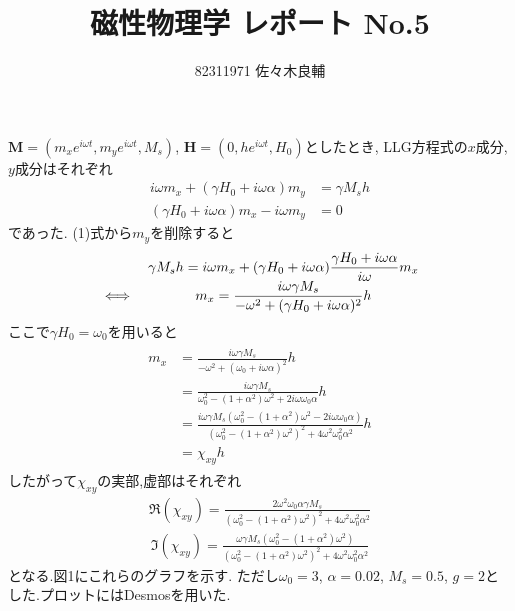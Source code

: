 \documentclass[uplatex,a4j,11pt,dvipdfmx]{jsarticle}
\begin{document}
\title{磁性物理学 レポート No.5}
\author{82311971 佐々木良輔}
\date{}
\maketitle
${\bm M}=(m_xe^{i\omega t},m_ye^{i\omega t},M_s)$, ${\bm H}=(0,he^{i\omega t}, H_0)$としたとき,
LLG方程式の$x$成分, $y$成分はそれぞれ
\begin{align}
  i\omega m_x+(\gamma H_0+i\omega\alpha)m_y&=\gamma M_s h\\
  (\gamma H_0+i\omega \alpha)m_x-i\omega m_y&=0
\end{align}
であった. (1)式から$m_y$を削除すると
\begin{align}
  {
    \everymath{\displaystyle}
    \begin{array}{cc}
      &\gamma M_sh=i\omega m_x+(\gamma H_0+i\omega\alpha)\frac{\gamma H_0+i\omega\alpha}{i\omega}m_x\\
      \iff&m_x=\frac{i\omega\gamma M_s}{-\omega^2+(\gamma H_0+i\omega\alpha)^2}h\\
    \end{array}
  }
\end{align}
ここで$\gamma H_0=\omega_0$を用いると
\begin{align}
  \begin{split}
    m_x&=\frac{i\omega\gamma M_s}{-\omega^2+(\omega_0+i\omega\alpha)^2}h\\
    &=\frac{i\omega\gamma M_s}{\omega_0^2-(1+\alpha^2)\omega^2+2i\omega\omega_0\alpha}h\\
    &=\frac{i\omega\gamma M_s\left(\omega_0^2-(1+\alpha^2)\omega^2-2i\omega\omega_0\alpha\right)}
    {\left(\omega_0^2-(1+\alpha^2)\omega^2\right)^2+4\omega^2\omega_0^2\alpha^2}h\\
    &=\chi_{xy}h
  \end{split}
\end{align}
したがって$\chi_{xy}$の実部,虚部はそれぞれ
\begin{align}
  \Re(\chi_{xy})=\frac{2\omega^2\omega_0\alpha\gamma M_s}
  {\left(\omega_0^2-(1+\alpha^2)\omega^2\right)^2+4\omega^2\omega_0^2\alpha^2}
\end{align}
\begin{align}
  \Im(\chi_{xy})=\frac{\omega\gamma M_s(\omega_0^2-(1+\alpha^2)\omega^2)}
  {\left(\omega_0^2-(1+\alpha^2)\omega^2\right)^2+4\omega^2\omega_0^2\alpha^2}
\end{align}
となる.図1にこれらのグラフを示す.
ただし$\omega_0=3$, $\alpha=0.02$, $M_s=0.5$, $g=2$とした.プロットにはDesmosを用いた.
\end{document}
